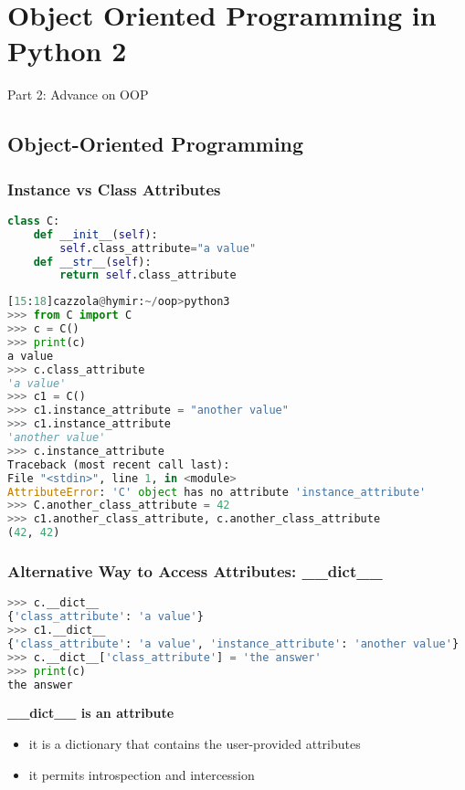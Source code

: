 \section{Object Oriented Programming in Python 2}

Part 2: Advance on OOP

\subsection{Object-Oriented Programming}

\subsubsection{Instance vs Class Attributes}

\begin{lstlisting}[language=Python]
class C:
	def __init__(self):
		self.class_attribute="a value"
	def __str__(self):
		return self.class_attribute
\end{lstlisting}

\begin{lstlisting}[language=Python]
[15:18]cazzola@hymir:~/oop>python3
>>> from C import C
>>> c = C()
>>> print(c)
a value
>>> c.class_attribute
'a value'
>>> c1 = C()
>>> c1.instance_attribute = "another value"
>>> c1.instance_attribute
'another value'
>>> c.instance_attribute
Traceback (most recent call last):
File "<stdin>", line 1, in <module>
AttributeError: 'C' object has no attribute 'instance_attribute'
>>> C.another_class_attribute = 42
>>> c1.another_class_attribute, c.another_class_attribute
(42, 42)
\end{lstlisting}

\subsubsection{Alternative Way to Access Attributes: \_\_dict\_\_}

\begin{lstlisting}[language=Python]
>>> c.__dict__
{'class_attribute': 'a value'}
>>> c1.__dict__
{'class_attribute': 'a value', 'instance_attribute': 'another value'}
>>> c.__dict__['class_attribute'] = 'the answer'
>>> print(c)
the answer
\end{lstlisting}

\textbf{\_\_dict\_\_ is an attribute}
\begin{itemize}
	\item it is a dictionary that contains the user-provided attributes
	\item it permits introspection and intercession
\end{itemize}

